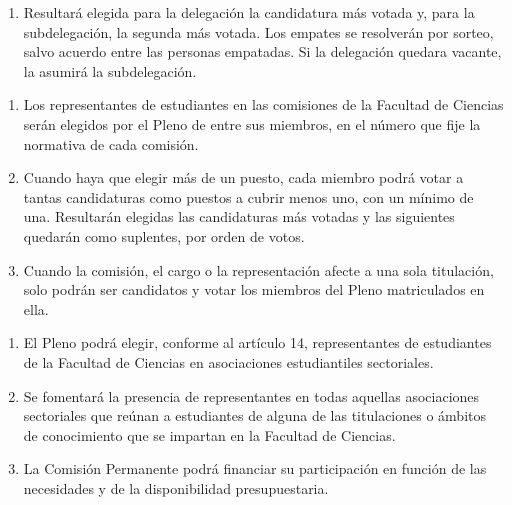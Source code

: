 \documentclass[11pt,a4paper]{article}
\begin{document}
\begin{enumerate}[resume]
\item Resultará elegida para la delegación la candidatura más votada y, para la subdelegación, la segunda más votada. Los empates se resolverán por sorteo, salvo acuerdo entre las personas empatadas. Si la delegación quedara vacante, la asumirá la subdelegación.
\end{enumerate}


\begin{enumerate}
\item Los representantes de estudiantes en las comisiones de la Facultad de Ciencias serán elegidos por el Pleno de entre sus miembros, en el número que fije la normativa de cada comisión.
\item Cuando haya que elegir más de un puesto, cada miembro podrá votar a tantas candidaturas como puestos a cubrir menos uno, con un mínimo de una. Resultarán elegidas las candidaturas más votadas y las siguientes quedarán como suplentes, por orden de votos.
\item Cuando la comisión, el cargo o la representación afecte a una sola titulación, solo podrán ser candidatos y votar los miembros del Pleno matriculados en ella.
\end{enumerate}

\begin{enumerate}
\item El Pleno podrá elegir, conforme al artículo 14, representantes de estudiantes de la Facultad de Ciencias en asociaciones estudiantiles sectoriales.
\item Se fomentará la presencia de representantes en todas aquellas asociaciones sectoriales que reúnan a estudiantes de alguna de las titulaciones o ámbitos de conocimiento que se impartan en la Facultad de Ciencias.
\item La Comisión Permanente podrá financiar su participación en función de las necesidades y de la disponibilidad presupuestaria.
\end{enumerate}
\end{document}
